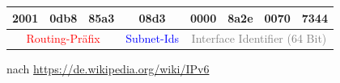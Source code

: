 \begin{frame}[fragile]
\begin{tiny}
\begin{center}
\begin{tabular}{|c|c|c|c|c|c|c|c|c|c|c|c|c|c|c|c|}
     
    \hline

    \multicolumn{2}{|c|}{2001} & \multicolumn{2}{c|}{0db8} &
      \multicolumn{2}{c|}{85a3} & \multicolumn{2}{c|}{08d3} &
        \multicolumn{2}{c|}{0000} & \multicolumn{2}{c|}{8a2e} &
          \multicolumn{2}{c|}{0070} & \multicolumn{2}{c|}{7344} \\
    \hline
    \multicolumn{6}{|c|}{\tiny{\textcolor{red}{Routing-Präfix}}} &
    \multicolumn{2}{c|}{\tiny{\textcolor{blue}{Subnet-Ids}}} &
    \multicolumn{8}{c|}{\footnotesize{\textcolor{gray}{Interface Identifier (64 Bit)}}}\\  
    \hline
    \end{tabular}
  \end{center}
\end{tiny}

\vspace{0.4cm}
\begin{flushright}
\begin{tiny}
nach  \href{https://de.wikipedia.org/wiki/IPv6}{https://de.wikipedia.org/wiki/IPv6}
\end{tiny}
\end{flushright}
\end{frame}


